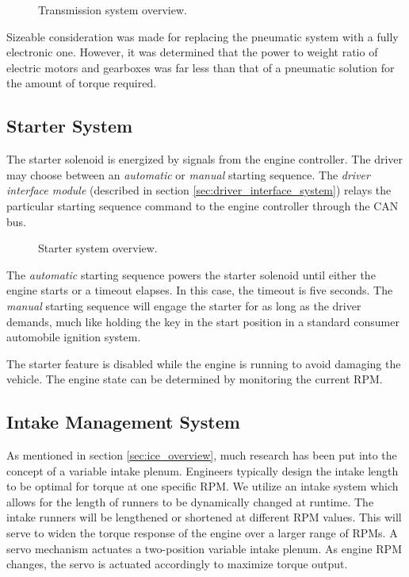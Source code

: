 \begin{figure}[H]
	\centering
		
	\caption{Transmission system overview.}
	\label{fig:transmission_system_overview}
\end{figure}

Sizeable consideration was made for replacing the pneumatic system with a fully electronic one. However, it was determined that the power to weight ratio of electric motors and gearboxes was far less than that of a pneumatic solution for the amount of torque required.

\subsection{Starter System}

The starter solenoid is energized by signals from the engine controller. The driver may choose between an \emph{automatic} or \emph{manual} starting sequence. The \emph{driver interface module} (described in section \ref{sec:driver_interface_system}) relays the particular starting sequence command to the engine controller through the CAN bus.

\begin{figure}[H]
	\centering
		
	\caption{Starter system overview.}
	\label{fig:starter_system_overview}
\end{figure}

The \emph{automatic} starting sequence powers the starter solenoid until either the engine starts or a timeout elapses. In this case, the timeout is five seconds. The \emph{manual} starting sequence will engage the starter for as long as the driver demands, much like holding the key in the start position in a standard consumer automobile ignition system. 

The starter feature is disabled while the engine is running to avoid damaging the vehicle. The engine state can be determined by monitoring the current RPM.

\subsection{Intake Management System}

As mentioned in section \ref{sec:ice_overview}, much research has been put into the concept of a variable intake plenum. Engineers typically design the intake length to be optimal for torque at one specific RPM. We utilize an intake system which allows for the length of runners to be dynamically changed at runtime. The intake runners will be lengthened or shortened at different RPM values. This will serve to widen the torque response of the engine over a larger range of RPMs. A servo mechanism actuates a two-position variable intake plenum. As engine RPM changes, the servo is actuated accordingly to maximize torque output.


